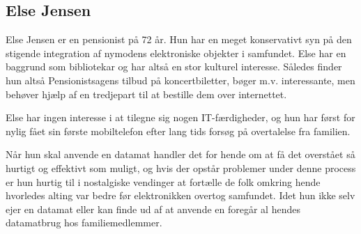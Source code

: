 \subsection{Else Jensen}

Else Jensen er en pensionist på 72 år. Hun har en meget konservativt syn på
den stigende integration af nymodens elektroniske objekter i samfundet. Else
har en baggrund som bibliotekar og har altså en stor kulturel interesse.
Således finder hun altså Pensionistsagens tilbud på koncertbiletter, bøger
m.v. interessante, men behøver hjælp af en tredjepart til at bestille dem
over internettet.

Else har ingen interesse i at tilegne sig nogen IT-færdigheder, og hun har
først for nylig fået sin første mobiltelefon efter lang tids forsøg på
overtalelse fra familien.

Når hun skal anvende en datamat handler det for hende om at få det
overstået så hurtigt og effektivt som muligt, og hvis der opstår problemer
under denne process er hun hurtig til i nostalgiske vendinger at fortælle
de folk omkring hende hvorledes alting var bedre før elektronikken overtog
samfundet. Idet hun ikke selv ejer en datamat eller kan finde ud af at anvende
en foregår al hendes datamatbrug hos familiemedlemmer.

